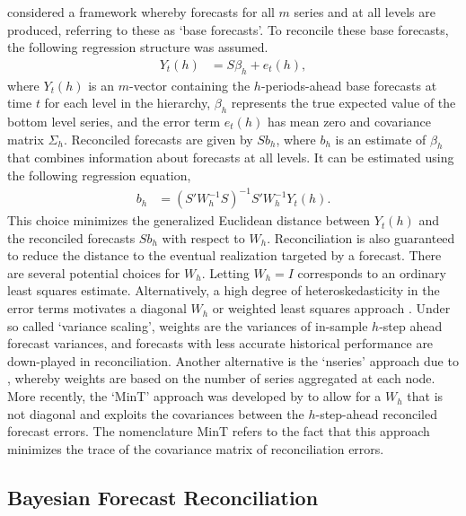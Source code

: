 \documentclass[a4paper,fleqn,11pt]{article}
\begin{document}
\cite{Hyndman2011} considered a framework whereby forecasts for all $m$ series and at all levels are produced, referring to these as `base forecasts'. To reconcile these base forecasts, the following regression structure was assumed.
\begin{align}
	Y_t(h) &= S\beta_{h} + e_t(h),
	\label{eq:regstruct}
\end{align}
where $Y_t(h)$ is an $m$-vector containing the $h$-periods-ahead base forecasts at time $t$ for each level in the hierarchy, $\beta_{h}$ represents the true expected value of the bottom level series, and the error term $e_t(h)$ has mean zero and covariance matrix $\Sigma_h$. Reconciled forecasts are given by $Sb_{h}$, where $b_h$ is an estimate of $\beta_{h}$ that combines information about forecasts at all levels. It can be estimated using the following regression equation,
\begin{align}
	\label{eq:reg}
	b_{h} &= \left(S'W_h^{-1}S \right)^{-1} S'W_h^{-1}Y_t(h).
\end{align}
This choice minimizes the generalized Euclidean distance between $Y_t(h)$ and the reconciled forecasts $Sb_{h}$ with respect to $W_h$. Reconciliation is also guaranteed to reduce the distance to the eventual realization targeted by a forecast. There are several potential choices for $W_h$. Letting $W_h=I$ corresponds to an ordinary least squares estimate. Alternatively, a high degree of heteroskedasticity in the error terms motivates a diagonal $W_h$ or weighted least squares approach \citep{Hyndman2016}. Under so called `variance scaling', weights are the variances of in-sample $h$-step ahead forecast variances, and forecasts with less accurate historical performance are down-played in reconciliation. Another alternative is the `nseries' approach due to \cite{Athanasopoulos2017}, whereby weights are based on the number of series aggregated at each node. More recently, the `MinT' approach was developed by \cite{Wickramasuriya2015} to allow for a $W_h$ that is not diagonal and exploits the covariances between the $h$-step-ahead reconciled forecast errors. The nomenclature MinT refers to the fact that this approach minimizes the trace of the covariance matrix of reconciliation errors.

\subsection{Bayesian Forecast Reconciliation}\label{sec:model}
\end{document}
